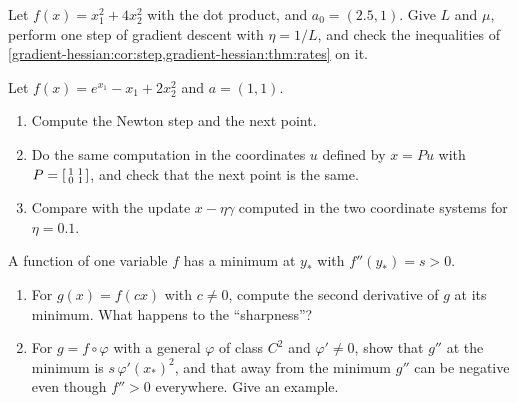 \begin{notechapter}
\begin{exercise}\label{gradient-hessian:exr:7}
Let $f(x) = x_1^2 + 4x_2^2$ with the dot product, and $a_0 = (2.5, 1)$.
Give $L$ and $\mu$, perform one step of gradient descent with
$\eta = 1/L$, and check the inequalities of
\cref{gradient-hessian:cor:step,gradient-hessian:thm:rates} on it.
\end{exercise}

\begin{exercise}\label{gradient-hessian:exr:8}
Let $f(x) = e^{x_1} - x_1 + 2x_2^2$ and $a = (1, 1)$.
\begin{enumerate}[nosep]
  \item Compute the Newton step and the next point.
  \item Do the same computation in the coordinates $u$ defined by
        $x = Pu$ with
        $P = \begin{bsmallmatrix}1 & 1\\0 & 1\end{bsmallmatrix}$, and
        check that the next point is the same.
  \item Compare with the update $x - \eta\gamma$ computed in the two
        coordinate systems for $\eta = 0.1$.
\end{enumerate}
\end{exercise}

\begin{exercise}\label{gradient-hessian:exr:9}
A function of one variable $f$ has a minimum at $y_*$ with
$f''(y_*) = s > 0$.
\begin{enumerate}[nosep]
  \item For $g(x) = f(cx)$ with $c\neq0$, compute the second derivative
        of $g$ at its minimum. What happens to the ``sharpness''?
  \item For $g = f\circ\varphi$ with a general $\varphi$ of class $C^2$
        and $\varphi'\neq0$, show that $g''$ at the minimum is
        $s\,\varphi'(x_*)^2$, and that away from the minimum $g''$ can be
        negative even though $f'' > 0$ everywhere. Give an example.
\end{enumerate}
\end{exercise}
\end{notechapter}
